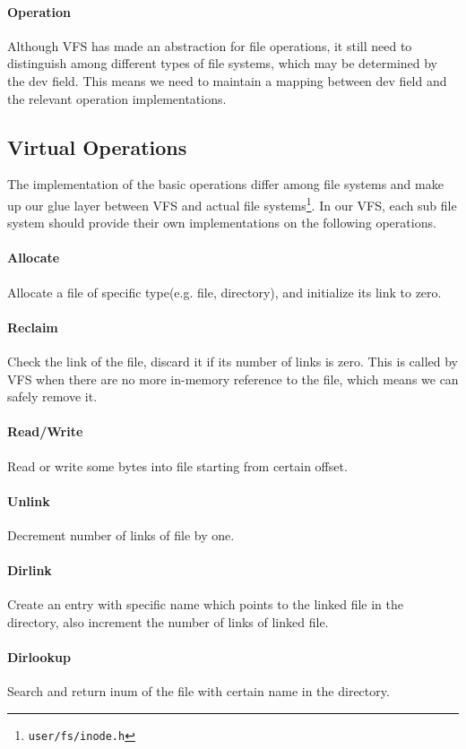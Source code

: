 \documentclass[11pt,a4paper]{article}
\begin{document}
\paragraph{Operation}
Although VFS has made an abstraction for file operations, it still need to distinguish among different types of file systems, which may be determined by the dev field. This means we need to maintain a mapping between dev field and the relevant operation implementations.

\subsection{Virtual Operations}
The implementation of the basic operations differ among file systems and make up our glue layer between VFS and actual file systems\footnote{\texttt{user/fs/inode.h}}. In our VFS, each sub file system should provide their own implementations on the following operations.

\paragraph{Allocate}
Allocate a file of specific type(e.g. file, directory), and initialize its link to zero.
\paragraph{Reclaim}
Check the link of the file, discard it if its number of links is zero. This is called by VFS when there are no more in-memory reference to the file, which means we can safely remove it.
\paragraph{Read/Write}
Read or write some bytes into file starting from certain offset.
\paragraph{Unlink}
Decrement number of links of file by one.
\paragraph{Dirlink}
Create an entry with specific name which points to the linked file in the directory, also increment the number of links of linked file.
\paragraph{Dirlookup}
Search and return inum of the file with certain name in the directory.





\end{document}
